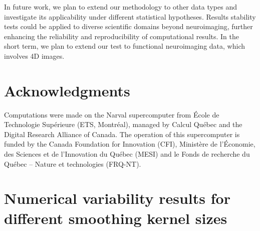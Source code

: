 \documentclass[lettersize,journal]{IEEEtran}
\begin{document}
In future work, we plan to extend our methodology to other data types and investigate its applicability under different statistical hypotheses.
Results stability tests could be applied to diverse scientific domains beyond neuroimaging, further enhancing the reliability and reproducibility of computational results. In the short term, we plan to extend our test to functional neuroimaging data, which involves 4D images.


\section*{Acknowledgments}

Computations were made on the Narval supercomputer from \'Ecole de Technologie
Sup\'erieure (ETS, Montr\'eal), managed by Calcul Québec and the Digital Research Alliance of Canada. The
operation of this supercomputer is funded by the Canada Foundation for
Innovation (CFI), Ministère de l’Économie, des Sciences et de l’Innovation du
Québec (MESI) and le Fonds de recherche du Québec – Nature et technologies
(FRQ-NT).




\appendix

\section*{Numerical variability results for different smoothing kernel sizes}
\label{appendix:numerical_uncertainty}

\end{document}

